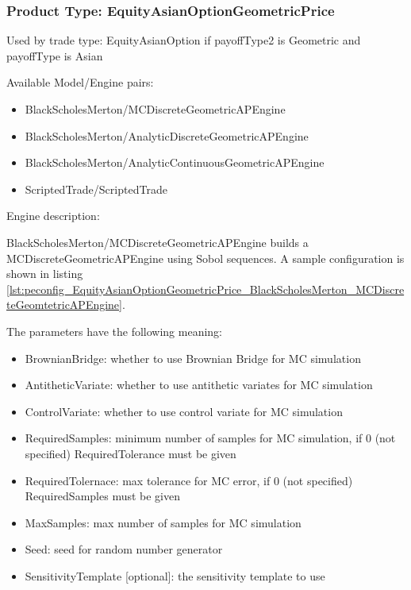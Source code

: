\subsubsection{Product Type: EquityAsianOptionGeometricPrice}

Used by trade type: EquityAsianOption if payoffType2 is Geometric and payoffType is Asian

Available Model/Engine pairs:

\begin{itemize}
  \item BlackScholesMerton/MCDiscreteGeometricAPEngine
  \item BlackScholesMerton/AnalyticDiscreteGeometricAPEngine
  \item BlackScholesMerton/AnalyticContinuousGeometricAPEngine
  \item ScriptedTrade/ScriptedTrade
\end{itemize}

Engine description:

BlackScholesMerton/MCDiscreteGeometricAPEngine builds a MCDiscreteGeometricAPEngine using Sobol sequences. A sample
configuration is shown in listing
\ref{lst:peconfig_EquityAsianOptionGeometricPrice_BlackScholesMerton_MCDiscreteGeomtetricAPEngine}.

The parameters have the following meaning:

\begin{itemize}
\item BrownianBridge: whether to use Brownian Bridge for MC simulation
\item AntitheticVariate: whether to use antithetic variates for MC simulation
\item ControlVariate: whether to use control variate for MC simulation
\item RequiredSamples: minimum number of samples for MC simulation, if 0 (not specified) RequiredTolerance must be given
\item RequiredTolernace: max tolerance for MC error, if 0 (not specified) RequiredSamples must be given
\item MaxSamples: max number of samples for MC simulation
\item Seed: seed for random number generator
\item SensitivityTemplate [optional]: the sensitivity template to use 
\end{itemize}

